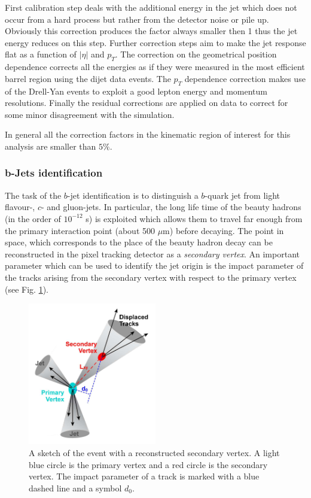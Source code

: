 First calibration step deals with the additional energy in the jet which does not occur from a hard process but rather from the detector noise or pile up. 
Obviously this correction produces the factor always smaller then 1 thus the jet energy reduces on this step. Further correction steps aim to make the jet response
flat as a function of $|\eta|$ and $p_{T}$. The correction on the geometrical position dependence corrects all the energies as if they were measured 
in the most efficient barrel region using the dijet data events. The $p_{T}$ dependence correction makes use of the Drell-Yan events to exploit a good
lepton energy and momentum resolutions. Finally the residual corrections are applied on data to correct for some minor disagreement with the simulation.

In general all the correction factors in the kinematic region of interest for this analysis are smaller than $5\%$.

\subsubsection{b-Jets identification}\label{ssec:bTag}

The task of the $b$-jet identification is to distinguish a $b$-quark jet from light flavour-, $c$- and gluon-jets. In particular,
the long life time of the beauty hadrons (in the order of $10^{-12}$ s) is exploited which allows them to travel far enough from the primary interaction point 
(about 500 $\mu$m) before decaying. The point in space, which corresponds to the place of the beauty hadron decay can be reconstructed in the pixel tracking 
detector as a \textit{secondary vertex}. An important parameter which can be used to identify the jet origin is the impact parameter of the tracks arising 
from the secondary vertex with respect to the primary vertex (see Fig. \ref{fig:SV}).

\begin{figure}[t]
  \centering
  \includegraphics[width=0.5\textwidth]{04_event_reconstruction/plots/btagging_cartoon.png}
  \caption{A sketch of the event with a reconstructed secondary vertex. A light blue circle is the primary vertex and a red circle is the secondary vertex. The impact 
  parameter of a track is marked with a blue dashed line and a symbol $d_{0}$.}
  \label{fig:SV}
\end{figure}

